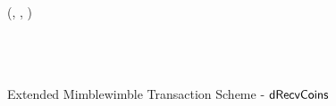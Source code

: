 \begin{landscape}
\begin{figure}
{{            \< (\varSigBobCarol, \varPubKeyBobCarol, \funStar{\varSigContext}) \opFunResult \procDSign{\varMsg}{\varSecKeyBob}{\varSecKeyBob}{\varNonceAlice}{\varNonceBob}
            \< \\
            \< \funStarAlt{\varSigContext} \opFunResult {} \< \\
            \< \varProofBobCarol \opFunResult \procDRProof{\funStarAlt{\varCoinShared}}{\varFundValue}{\varSecKeyAlice}{\varSecKeyBob} \< \\
            \< \varPreTx \opFunResult \procCreatePreTx{\varMsg}{\varInputs}{\varOutputs \opConc \funStarAlt{\varCoinShared}}{\varProofs \opConc \varProofBobCarol}{\funStarAlt{\varSigContext}}{\varCommits \opConc \varPubKeyBobCarol}{\varSigBobCarol}{\varTime} \< \\
            \pcreturn \varPreTx \< \< \pcreturn \varPreTx
            }
            }
        \caption{Extended Mimblewimble Transaction Scheme - $\mathsf{dRecvCoins}$ \label{fig:ext-mim-tx-recv}}
    \end{figure}
\end{landscape}
\restoregeometry

